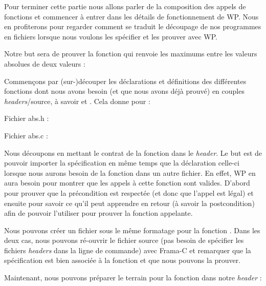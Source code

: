 Pour terminer cette partie nous allons parler de la composition des appels de
fonctions et commencer à entrer dans les détails de fonctionnement de WP. Nous
en profiterons pour regarder comment se traduit le découpage de nos
programmes en fichiers lorsque nous voulons les spécifier et les prouver avec WP.



Notre but sera de prouver la fonction  qui renvoie les maximums
entre les valeurs absolues de deux valeurs :






Commençons par (sur-)découper les déclarations et définitions des différentes
fonctions dont nous avons besoin (et que nous avons déjà prouvé) en couples
\textit{headers}/source, à savoir  et . Cela donne
pour  :



Fichier abs.h :



Fichier abs.c :




Nous découpons en mettant le contrat de la fonction dans le \textit{header}. Le
but est de pouvoir importer la spécification en même temps que la déclaration
celle-ci lorsque nous aurons besoin de la fonction dans un autre fichier. En
effet, WP en aura besoin pour montrer que les appels à cette
fonction sont valides. D'abord pour prouver que la précondition est respectée
(et donc que l'appel est légal) et ensuite pour savoir ce qu'il peut apprendre
en retour (à savoir la postcondition) afin de pouvoir l'utiliser pour prouver
la fonction appelante.



Nous pouvons créer un fichier sous le même formatage pour la fonction .
Dans les deux cas, nous pouvons ré-ouvrir le fichier source (pas besoin de
spécifier les fichiers \textit{headers} dans la ligne de commande) avec Frama-C et
remarquer que la spécification est bien associée à la fonction et que nous
pouvons la prouver.



Maintenant, nous pouvons préparer le terrain pour la fonction  dans notre \textit{header} :



